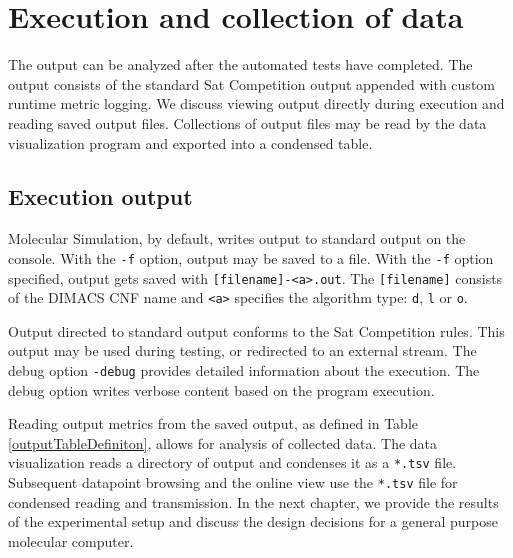\FloatBarrier


	\section{Execution and collection of data}


The output can be analyzed after the automated tests have completed.  The output consists of the standard {\sc Sat} Competition output appended with custom runtime metric logging.  We discuss viewing output directly during execution and reading saved output files.  Collections of output files may be read by the data visualization program and exported into a condensed table. 

		\subsection{Execution output}


	Molecular Simulation, by default, writes output to standard output on the console.  With the \texttt{-f} option, output may be saved to a file.  With the \texttt{-f} option specified, output gets saved with \texttt{[filename]-<a>.out}.  The \texttt{[filename]} consists of the DIMACS CNF name and \texttt{<a>} specifies the algorithm type: \texttt{d}, \texttt{l} or \texttt{o}.

	Output directed to standard output conforms to the {\sc Sat} Competition rules.  This output may be used during testing, or redirected to an external stream.  The debug option \texttt{-debug} provides detailed information about the execution.  The debug option writes verbose content based on the program execution.  

	Reading output metrics from the saved output, as defined in Table \ref{outputTableDefiniton}, allows for analysis of collected data.  The data visualization reads a directory of output and condenses it as a \texttt{*.tsv} file.  Subsequent datapoint browsing and the online view use the \texttt{*.tsv} file for condensed reading and transmission.  In the next chapter, we provide the results of the experimental setup and discuss the design decisions for a general purpose molecular computer.  
